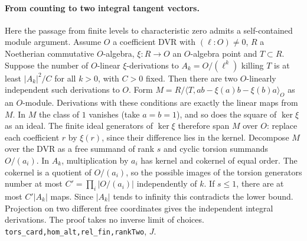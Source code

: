 \paragraph{From counting to two integral tangent vectors.}
Here the passage from finite levels to characteristic zero admits a
self-contained module argument. Assume $O$ a coefficient DVR with
$(\ell:O)\ne0$, $R$ a Noetherian commutative $O$-algebra, $\xi:R\to O$
an $O$-algebra point and $T\subset R$. Suppose the number of $O$-linear
$\xi$-derivations to $A_k=O/(\ell^k)$ killing $T$ is at least
$|A_k|^2/C$ for all $k>0$, with $C>0$ fixed. Then there are two
$O$-linearly independent such derivations to $O$.
Form $M=R/\langle T,ab-\xi(a)b-\xi(b)a\rangle_O$ as an $O$-module.
Derivations with these conditions are exactly the linear maps from $M$.
In $M$ the class of $1$ vanishes (take $a=b=1$), and so does the square
of $\ker\xi$ as an ideal. The finite ideal generators of $\ker\xi$
therefore span $M$ over $O$: replace each coefficient $r$ by $\xi(r)$,
since their difference lies in the kernel. Decompose $M$ over the DVR
as a free summand of rank $s$ and cyclic torsion summands $O/(a_i)$.
In $A_k$, multiplication by $a_i$ has kernel and cokernel of equal order.
The cokernel is a quotient of $O/(a_i)$, so the possible images of the
torsion generators number at most $C'=\prod_i|O/(a_i)|$ independently of
$k$. If $s\le1$, there are at most $C'|A_k|$ maps. Since $|A_k|$ tends
to infinity this contradicts the lower bound. Projection on two different
free coordinates gives the independent integral derivations. The proof
takes no inverse limit of choices. \nolinkurl{tors_card,hom_alt,rel_fin,rankTwo},
$J$.

